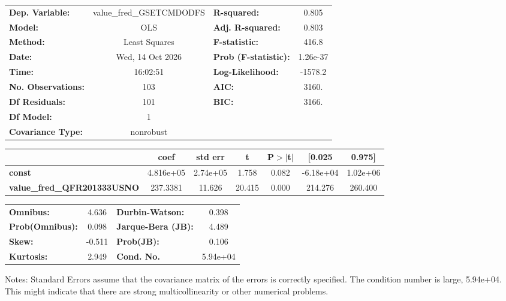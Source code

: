 \begin{center}
\begin{tabular}{lclc}
\toprule
\textbf{Dep. Variable:}             & value\_fred\_GSETCMDODFS & \textbf{  R-squared:         } &     0.805   \\
\textbf{Model:}                     &           OLS            & \textbf{  Adj. R-squared:    } &     0.803   \\
\textbf{Method:}                    &      Least Squares       & \textbf{  F-statistic:       } &     416.8   \\
\textbf{Date:}                      &     Wed, 14 Oct 2026     & \textbf{  Prob (F-statistic):} &  1.26e-37   \\
\textbf{Time:}                      &         16:02:51         & \textbf{  Log-Likelihood:    } &   -1578.2   \\
\textbf{No. Observations:}          &             103          & \textbf{  AIC:               } &     3160.   \\
\textbf{Df Residuals:}              &             101          & \textbf{  BIC:               } &     3166.   \\
\textbf{Df Model:}                  &               1          & \textbf{                     } &             \\
\textbf{Covariance Type:}           &        nonrobust         & \textbf{                     } &             \\
\bottomrule
\end{tabular}
\begin{tabular}{lcccccc}
                                    & \textbf{coef} & \textbf{std err} & \textbf{t} & \textbf{P$> |$t$|$} & \textbf{[0.025} & \textbf{0.975]}  \\
\midrule
\textbf{const}                      &    4.816e+05  &     2.74e+05     &     1.758  &         0.082        &    -6.18e+04    &     1.02e+06     \\
\textbf{value\_fred\_QFR201333USNO} &     237.3381  &       11.626     &    20.415  &         0.000        &      214.276    &      260.400     \\
\bottomrule
\end{tabular}
\begin{tabular}{lclc}
\textbf{Omnibus:}       &  4.636 & \textbf{  Durbin-Watson:     } &    0.398  \\
\textbf{Prob(Omnibus):} &  0.098 & \textbf{  Jarque-Bera (JB):  } &    4.489  \\
\textbf{Skew:}          & -0.511 & \textbf{  Prob(JB):          } &    0.106  \\
\textbf{Kurtosis:}      &  2.949 & \textbf{  Cond. No.          } & 5.94e+04  \\
\bottomrule
\end{tabular}
\end{center}

Notes: \newline
 [1] Standard Errors assume that the covariance matrix of the errors is correctly specified. \newline
 [2] The condition number is large, 5.94e+04. This might indicate that there are \newline
 strong multicollinearity or other numerical problems.